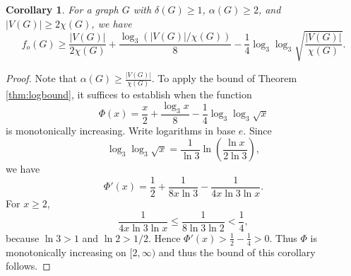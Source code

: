 \documentclass[11pt]{article}
\newtheorem{corollary}[theorem]{Corollary}
\theoremstyle{definition}
\theoremstyle{remark}
\newcommand{\1}{\mathbf{1}}
\begin{document}
	
	\begin{corollary}
		For a graph $G$ with $\delta(G)\ge 1$, $\alpha(G)\ge 2$, and $|V(G)|\ge 2\chi(G)$, we have \[
		f_o(G)\ge
		\frac{|V(G)|}{2\chi(G)}
		+
		\frac{\log_3(|V(G)|/\chi(G))}{8}
		-
		\frac14
		\log_3\log_3
		\sqrt{\frac{|V(G)|}{\chi(G)}}.
		\]
	\end{corollary}
	
	\begin{proof}
		Note that $\alpha(G)\ge \frac{|V(G)|}{\chi(G)}$. To apply the bound of Theorem \ref{thm:logbound}, it suffices to establish when the function 
		\[
		\Phi(x)=\frac{x}{2}+\frac{\log_3 x}{8}
		-\frac{1}{4}\log_3\log_3\sqrt{x}
		\]
		is monotonically increasing.
		Write logarithms in base $e$.  Since
		\[
		\log_3\log_3\sqrt{x}
		=
		\frac{1}{\ln 3}\ln\!\left(\frac{\ln x}{2\ln 3}\right),
		\]
		we have
		\[
		\Phi'(x)=
		\frac12+\frac{1}{8x\ln 3}
		-\frac{1}{4x\ln 3\ln x}.
		\]
		For $x\ge 2$,
		\[
		\frac{1}{4x\ln3\ln x}
		\le
		\frac{1}{8\ln3\ln2}
		<\frac14,
		\]
		because $\ln3>1$ and $\ln2>1/2$.  Hence
		\(
		\Phi'(x)>\frac12-\frac14>0.
		\)
		Thus $\Phi$ is monotonically increasing on $[2,\infty)$ and thus the bound of this corollary follows. 
	\end{proof}
	
\end{document}
